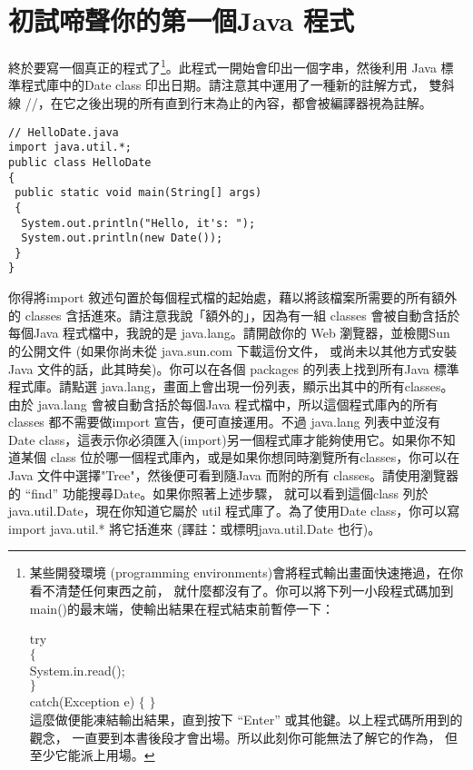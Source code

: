 \section{初試啼聲你的第一個Java 程式}
終於要寫一個真正的程式了\footnote{某些開發環境
(programming environments)會將程式輸出畫面快速捲過，在你看不清楚任何東西之前，
就什麼都沒有了。你可以將下列一小段程式碼加到
main()的最末端，使輸出結果在程式結束前暫停一下：

\noindent
try \\
$\{$\\
 System.in.read();\\
$\}$\\
catch(Exception e) $\{$ $\}$ \\

這麼做便能凍結輸出結果，直到按下 ``Enter'' 或其他鍵。以上程式碼所用到的觀念，
一直要到本書後段才會出場。所以此刻你可能無法了解它的作為，
但至少它能派上用場。}。此程式一開始會印出一個字串，然後利用
Java 標準程式庫中的Date class 印出日期。請注意其中運用了一種新的註解方式，
雙斜線 //，在它之後出現的所有直到行末為止的內容，都會被編譯器視為註解。

\begin{Verbatim}[frame=single]
// HelloDate.java
import java.util.*;
public class HelloDate 
{
 public static void main(String[] args) 
 {
  System.out.println("Hello, it's: ");
  System.out.println(new Date());
 }
}
\end{Verbatim}

你得將import 敘述句置於每個程式檔的起始處，藉以將該檔案所需要的所有額外的
classes 含括進來。請注意我說「額外的」，因為有一組
classes 會被自動含括於每個Java 程式檔中，我說的是 java.lang。請開啟你的
Web 瀏覽器，並檢閱Sun 的公開文件 (如果你尚未從 java.sun.com 下載這份文件，
或尚未以其他方式安裝Java 文件的話，此其時矣)。你可以在各個
packages 的列表上找到所有Java 標準程式庫。請點選
java.lang，畫面上會出現一份列表，顯示出其中的所有classes。
由於 java.lang 會被自動含括於每個Java 程式檔中，所以這個程式庫內的所有
classes 都不需要做import 宣告，便可直接運用。不過 java.lang 列表中並沒有
Date class，這表示你必須匯入(import)另一個程式庫才能夠使用它。如果你不知道某個
class 位於哪一個程式庫內，或是如果你想同時瀏覽所有classes，你可以在
Java 文件中選擇"Tree"，然後便可看到隨Java 而附的所有
classes。請使用瀏覽器的 ``find'' 功能搜尋Date。如果你照著上述步驟，
就可以看到這個class 列於 java.util.Date，現在你知道它屬於
util 程式庫了。為了使用Date class，你可以寫 import java.util.* 將它括進來
(譯註：或標明java.util.Date 也行)。

